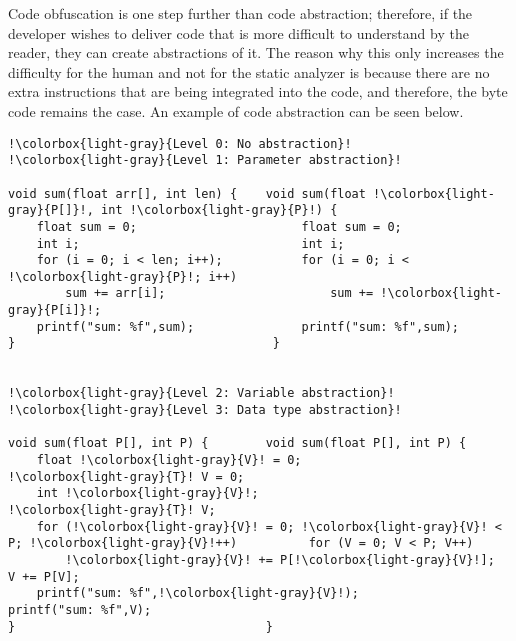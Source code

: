 \noindent Code obfuscation is one step further than code abstraction; therefore, if the developer wishes to deliver code that is more difficult to understand by the reader, they can create abstractions of it. The reason why this only increases the difficulty for the human and not for the static analyzer is because there are no extra instructions that are being integrated into the code, and therefore, the byte code remains the case. An example of code abstraction can be seen below.

\begin{lstlisting}[caption = {Levels of Code Abstraction}, columns=fixed, basewidth=0.5em, basicstyle={\ttfamily}, frame=lines, escapechar=!]
!\colorbox{light-gray}{Level 0: No abstraction}!           !\colorbox{light-gray}{Level 1: Parameter abstraction}!

void sum(float arr[], int len) {    void sum(float !\colorbox{light-gray}{P[]}!, int !\colorbox{light-gray}{P}!) { 
    float sum = 0;                       float sum = 0;
    int i;                               int i;
    for (i = 0; i < len; i++);           for (i = 0; i < !\colorbox{light-gray}{P}!; i++)
        sum += arr[i];                       sum += !\colorbox{light-gray}{P[i]}!;
    printf("sum: %f",sum);               printf("sum: %f",sum);
}                                    }


!\colorbox{light-gray}{Level 2: Variable abstraction}!     !\colorbox{light-gray}{Level 3: Data type abstraction}!

void sum(float P[], int P) {        void sum(float P[], int P) {
    float !\colorbox{light-gray}{V}! = 0;                       !\colorbox{light-gray}{T}! V = 0;
    int !\colorbox{light-gray}{V}!;                             !\colorbox{light-gray}{T}! V;
    for (!\colorbox{light-gray}{V}! = 0; !\colorbox{light-gray}{V}! < P; !\colorbox{light-gray}{V}!++)          for (V = 0; V < P; V++)
        !\colorbox{light-gray}{V}! += P[!\colorbox{light-gray}{V}!];                         V += P[V];
    printf("sum: %f",!\colorbox{light-gray}{V}!);               printf("sum: %f",V);
}                                   }
\end{lstlisting}



\newpage

